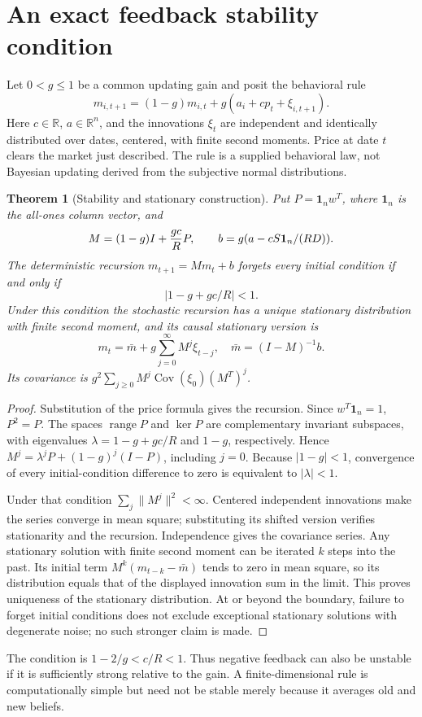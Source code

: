 \documentclass[11pt,a4paper]{article}
\newtheorem{theorem}{Theorem}[section]
\theoremstyle{definition}
\theoremstyle{remark}
\newcommand{\R}{\mathbb{R}}
\newcommand{\ind}{\mathbf{1}}
\DeclareMathOperator{\Cov}{Cov}
\begin{document}
\section{An exact feedback stability condition}
Let $0<g\le1$ be a common updating gain and posit the behavioral rule
\[
 m_{i,t+1}=(1-g)m_{i,t}+g(a_i+c p_t+\xi_{i,t+1}).
\]
Here $c\in\R$, $a\in\R^n$, and the innovations $\xi_t$ are independent and identically distributed over dates, centered, with finite second moments. Price at date $t$ clears the market just described. The rule is a supplied behavioral law, not Bayesian updating derived from the subjective normal distributions.
\begin{theorem}[Stability and stationary construction]
Put $P=\ind_n w^T$, where $\ind_n$ is the all-ones column vector, and
\[
 M=(1-g)I+{gc\over R}P,\qquad
 b=g(a-cS\ind_n/(RD)).
\]
The deterministic recursion $m_{t+1}=Mm_t+b$ forgets every initial condition if and only if
\[
 |1-g+gc/R|<1.
\]
Under this condition the stochastic recursion has a unique stationary distribution with finite second moment, and its causal stationary version is
\[
 m_t=\bar m+g\sum_{j=0}^\infty M^j\xi_{t-j},
 \quad \bar m=(I-M)^{-1}b.
\]
Its covariance is $g^2\sum_{j\ge0}M^j\Cov(\xi_0)(M^T)^j$.
\end{theorem}
\begin{proof}
Substitution of the price formula gives the recursion. Since $w^T\ind_n=1$, $P^2=P$. The spaces $\operatorname{range}P$ and $\ker P$ are complementary invariant subspaces, with eigenvalues
$\lambda=1-g+gc/R$ and $1-g$, respectively. Hence
$M^j=\lambda^jP+(1-g)^j(I-P)$, including $j=0$. Because $|1-g|<1$, convergence of every initial-condition difference to zero is equivalent to $|\lambda|<1$.

Under that condition $\sum_j\|M^j\|^2<\infty$. Centered independent innovations make the series converge in mean square; substituting its shifted version verifies stationarity and the recursion. Independence gives the covariance series. Any stationary solution with finite second moment can be iterated $k$ steps into the past. Its initial term $M^k(m_{t-k}-\bar m)$ tends to zero in mean square, so its distribution equals that of the displayed innovation sum in the limit. This proves uniqueness of the stationary distribution. At or beyond the boundary, failure to forget initial conditions does not exclude exceptional stationary solutions with degenerate noise; no such stronger claim is made.
\end{proof}
The condition is $1-2/g<c/R<1$. Thus negative feedback can also be unstable if it is sufficiently strong relative to the gain. A finite-dimensional rule is computationally simple but need not be stable merely because it averages old and new beliefs.
\end{document}
